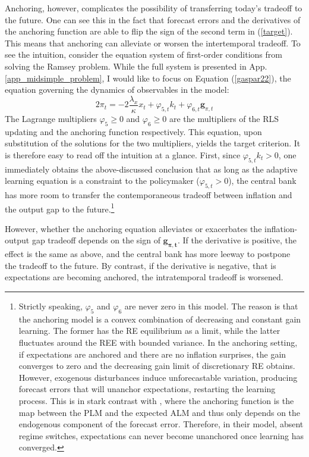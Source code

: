 \documentclass[11pt]{article}
\renewcommand{\[}{\begin{equation}}
\renewcommand{\]}{\end{equation}}
\begin{document}
Anchoring, however, complicates the possibility of transferring today's tradeoff to the future. One can see this in the fact that forecast errors and the derivatives of the anchoring function are able to flip the sign of the second term in (\ref{target}). This means that anchoring can alleviate or worsen the intertemporal tradeoff. To see the intuition, consider the equation system of first-order conditions from solving the Ramsey problem. While the full system is presented in App. \ref{app_midsimple_problem}, I would like to focus on Equation (\ref{gaspar22}), the equation governing the dynamics of observables in the model:
\begin{equation}
2\pi_t = - 2\frac{\lambda_x}{\kappa}x_t +\varphi_{5,t} k_t + \varphi_{6,t} \mathbf{g}_{\pi,t} 
\end{equation}
The Lagrange multipliers $\varphi_5 \geq 0$ and $\varphi_6 \geq 0$ are the multipliers of the RLS updating and the anchoring function respectively. This equation, upon substitution of the solutions for the two multipliers, yields the target criterion. It is therefore easy to read off the intuition at a glance. First, since $\varphi_{5,t}k_t > 0$, one immediately obtains the above-discussed conclusion that as long as the adaptive learning equation is a constraint to the policymaker ($\varphi_{5,t} > 0$), the central bank has more room to transfer the contemporaneous tradeoff between inflation and the output gap to the future.\footnote{Strictly speaking, $\varphi_5$ and $\varphi_6$ are never zero in this model. The reason is that the anchoring model is a convex combination of decreasing and constant gain learning. The former has the RE equilibrium as a limit, while the latter fluctuates around the REE with bounded variance. In the anchoring setting, if expectations are anchored and there are no inflation surprises, the gain converges to zero and the decreasing gain limit of discretionary RE obtains. However, exogenous disturbances induce unforecastable variation, producing forecast errors that will unanchor expectations, restarting the learning process. This is in stark contrast with \cite{carvalho2019anchored}, where the anchoring function is the map between the PLM and the expected ALM and thus only depends on the endogenous component of the forecast error. Therefore, in their model, absent regime switches, expectations can never become unanchored once learning has converged.}

However, whether the anchoring equation alleviates or exacerbates the inflation-output gap tradeoff depends on the sign of $\mathbf{g_{\pi,t}}$. If the derivative is positive, the effect is the same as above, and the central bank has more leeway to postpone the tradeoff to the future. By contrast, if the derivative is negative, that is expectations are becoming anchored, the intratemporal tradeoff is worsened.
\end{document}
